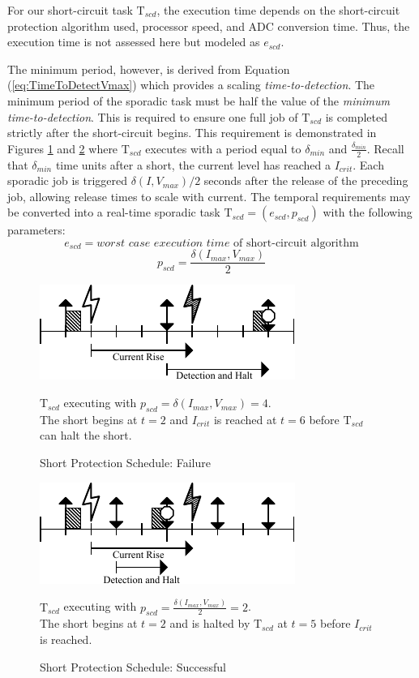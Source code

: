 For our short-circuit task $\mathrm{T}_{scd}$, the execution time depends on the short-circuit protection algorithm used, processor speed, and ADC conversion time. Thus, the execution time is not assessed here but modeled as $e_{scd}$.

The minimum period, however, is derived from Equation (\ref{eq:TimeToDetectVmax}) which provides a scaling \textit{time-to-detection}. The minimum period of the sporadic task must be half the value of the \textit{minimum time-to-detection}. This is required to ensure one full job of $\mathrm{T}_{scd}$ is completed strictly after the short-circuit begins. This requirement is demonstrated in Figures \ref{fig:shortedschedule} and \ref{fig:stoppedschedule} where $\mathrm{T}_{scd}$ executes with a period equal to $\delta_{min}$ and $\frac{\delta_{min}}{2}$. Recall that $\delta_{min}$ time units after a short, the current level has reached a $I_{crit}$. Each sporadic job is triggered $\delta(I,V_{max})/2$ seconds after the release of the preceding job, allowing release times to scale with current. The temporal requirements may be converted into a real-time sporadic task $\mathrm{T}_{scd} = (e_{scd}, p_{scd})$ with the following parameters:
\begin{equation}\label{eq:ExecutionTime}
e_{scd} = \textit{worst case execution time }\text{of short-circuit algorithm}
\end{equation}
\begin{equation}\label{eq:Period}
p_{scd} = \frac{\delta(I_{max},V_{max})}{2}
\end{equation}
\begin{figure}
    \centering
    \includegraphics[width=0.60\linewidth]{fig/shortedschedule.pdf}
    \caption{Short Protection Schedule: Failure} $\mathrm{T}_{scd}$ executing with $p_{scd} = \delta(I_{max},V_{max}) = 4$.\\The short begins at $t = 2$ and $I_{crit}$ is reached at $t = 6$ before $\mathrm{T}_{scd}$ can halt the short.
    \label{fig:shortedschedule}
\end{figure}
\begin{figure}
    \centering
    \includegraphics[width=0.60\linewidth]{fig/stoppedschedule.pdf}
    \caption{Short Protection Schedule: Successful} $\mathrm{T}_{scd}$ executing with $p_{scd} = \frac{\delta(I_{max},V_{max})}{2} = 2$.\\The short begins at $t = 2$ and is halted by $\mathrm{T}_{scd}$ at $t = 5$ before $I_{crit}$ is reached.
    \label{fig:stoppedschedule}
\end{figure}
